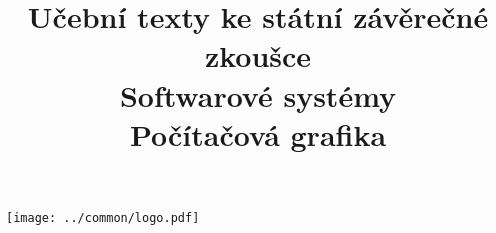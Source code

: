 \clearpage

\clearpage

\title{\LARGE Učební texty ke státní závěrečné zkoušce \\ Softwarové systémy \\ Počítačová grafika}




\maketitle

\vspace{10mm}
\begin{center}
\texttt{[image: ../common/logo.pdf]}
\end{center} 

\clearpage

\clearpage

\tableofcontents








